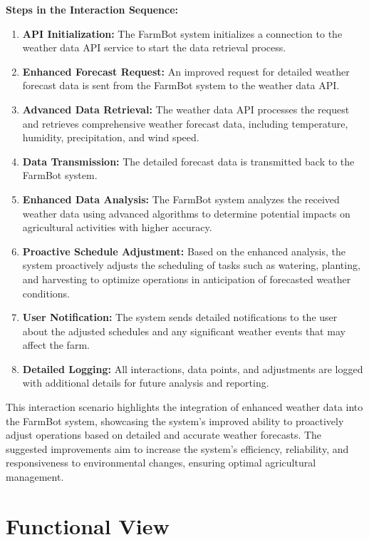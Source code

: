 \textbf{Steps in the Interaction Sequence:}
\begin{enumerate}
    \item \textbf{API Initialization:} The FarmBot system initializes a connection to the weather data API service to start the data retrieval process.
    \item \textbf{Enhanced Forecast Request:} An improved request for detailed weather forecast data is sent from the FarmBot system to the weather data API.
    \item \textbf{Advanced Data Retrieval:} The weather data API processes the request and retrieves comprehensive weather forecast data, including temperature, humidity, precipitation, and wind speed.
    \item \textbf{Data Transmission:} The detailed forecast data is transmitted back to the FarmBot system.
    \item \textbf{Enhanced Data Analysis:} The FarmBot system analyzes the received weather data using advanced algorithms to determine potential impacts on agricultural activities with higher accuracy.
    \item \textbf{Proactive Schedule Adjustment:} Based on the enhanced analysis, the system proactively adjusts the scheduling of tasks such as watering, planting, and harvesting to optimize operations in anticipation of forecasted weather conditions.
    \item \textbf{User Notification:} The system sends detailed notifications to the user about the adjusted schedules and any significant weather events that may affect the farm.
    \item \textbf{Detailed Logging:} All interactions, data points, and adjustments are logged with additional details for future analysis and reporting.
\end{enumerate}

This interaction scenario highlights the integration of enhanced weather data into the FarmBot system, showcasing the system's improved ability to proactively adjust operations based on detailed and accurate weather forecasts. The suggested improvements aim to increase the system's efficiency, reliability, and responsiveness to environmental changes, ensuring optimal agricultural management.

    

\section{Functional View}

